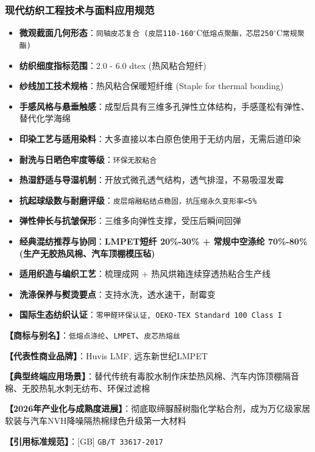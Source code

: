 \documentclass[11pt,openright,twoside,UTF8]{ctexbook}
\begin{document}
\subsubsection*{现代纺织工程技术与面料应用规范}
\begin{itemize} \setlength{\itemsep}{2pt}
    \item \textbf{微观截面几何形态}：\texttt{同轴皮芯复合 (皮层110-160$^\circ\mathrm{C}$低熔点聚酯，芯层250$^\circ\mathrm{C}$常规聚酯)}
    \item \textbf{纺织细度指标范围}：2.0 - 6.0 dtex (热风粘合短纤)
    \item \textbf{纱线加工技术规格}：热风粘合保暖短纤维 (Staple for thermal bonding)
    \item \textbf{手感风格与悬垂触感}：成型后具有三维多孔弹性立体结构，手感蓬松有弹性、替代化学海绵
    \item \textbf{印染工艺与适用染料}：大多直接以本白原色使用于无纺内层，无需后道印染
    \item \textbf{耐洗与日晒色牢度等级}：\texttt{环保无胶粘合}
    \item \textbf{热湿舒适与导湿机制}：开放式微孔透气结构，透气排湿，不易吸湿发霉
    \item \textbf{抗起球级数与耐磨评级}：\texttt{皮层熔融粘结点稳固，抗压缩永久变形率\textless{}5\%}
    \item \textbf{弹性伸长与抗皱保形}：三维多向弹性支撑，受压后瞬间回弹
    \item \textbf{经典混纺推荐与协同}：\textbf{LMPET短纤 20\%-30\% + 常规中空涤纶 70\%-80\% (生产无胶热风棉、汽车顶棚模压毡)}
    \item \textbf{适用织造与编织工艺}：梳理成网 + 热风烘箱连续穿透热粘合生产线
    \item \textbf{洗涤保养与熨烫要点}：支持水洗，透水速干，耐霉变
    \item \textbf{国际生态纺织认证}：\texttt{零甲醛环保认证, OEKO-TEX Standard 100 Class I}
\end{itemize}
\vspace{0.2cm}

\noindent\textbf{【商标与别名】}：\texttt{低熔点涤纶}、\texttt{LMPET}、\texttt{皮芯热熔丝}\par
\noindent\textbf{【代表性商业品牌】}：Huvis LMF, 远东新世纪LMPET\par
\noindent\textbf{【典型终端应用场景】}：替代传统有毒胶水制作床垫热风棉、汽车内饰顶棚隔音棉、无胶热轧水刺无纺布、环保过滤棉\par
\noindent\textbf{【2026年产业化与成熟度进展】}：彻底取缔脲醛树脂化学粘合剂，成为万亿级家居软装与汽车NVH降噪隔热棉绿色升级第一大材料\par
\noindent\textbf{【引用标准规范】}：[GB] \texttt{GB/T 33617-2017}\par
\vspace{0.5cm}
\end{document}
